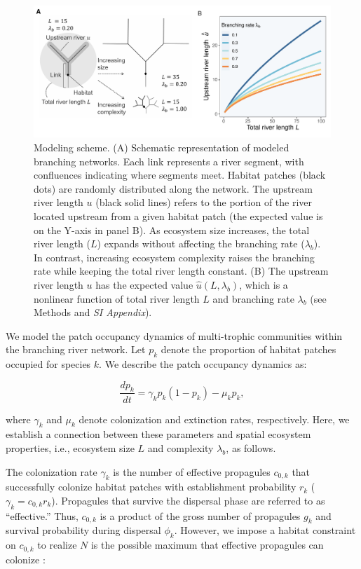 \documentclass[11pt, class=article, crop=false]{standalone}
\begin{document}
\begin{figure}
    \centering
    \includegraphics[width=\textwidth]{data_fmt/fig_theo_scheme.pdf}
    \caption{Modeling scheme. (A) Schematic representation of modeled branching networks. Each link represents a river segment, with confluences indicating where segments meet. Habitat patches (black dots) are randomly distributed along the network. The upstream river length $u$ (black solid lines) refers to the portion of the river located upstream from a given habitat patch (the expected value is on the Y-axis in panel B). As ecosystem size increases, the total river length ($L$) expands without affecting the branching rate ($\lambda_b$). In contrast, increasing ecosystem complexity raises the branching rate while keeping the total river length constant. (B) The upstream river length $u$ has the expected value $\hat{u}(L, \lambda_b)$, which is a nonlinear function of total river length $L$ and branching rate $\lambda_b$ (see Methods and \textit{SI Appendix}).}
    \label{fig:scheme}
\end{figure}

We model the patch occupancy dynamics of multi-trophic communities within the branching river network.
Let $p_k$ denote the proportion of habitat patches occupied for species $k$.
We describe the patch occupancy dynamics as:

\begin{equation}
    \frac{dp_k}{dt} = \gamma_{k} p_k (1 - p_k) - \mu_k p_k,
    \label{eq:model0}
\end{equation}

where $\gamma_k$ and $\mu_k$ denote colonization and extinction rates, respectively.
Here, we establish a connection between these parameters and spatial ecosystem properties, i.e., ecosystem size $L$ and complexity $\lambda_b$, as follows.

The colonization rate $\gamma_k$ is the number of effective propagules $c_{0,k}$ that successfully colonize habitat patches with establishment probability $r_k$ ($\gamma_k = c_{0,k} r_k$).
Propagules that survive the dispersal phase are referred to as ``effective.'' Thus, $c_{0,k}$ is a product of the gross number of propagules $g_k$ and survival probability during dispersal $\phi_k$.
However, we impose a habitat constraint on $c_{0,k}$ to realize $N$ is the possible maximum that effective propagules can colonize \citep{takimoto_effects_2012, terui_spatial_2019}:
\end{document}
